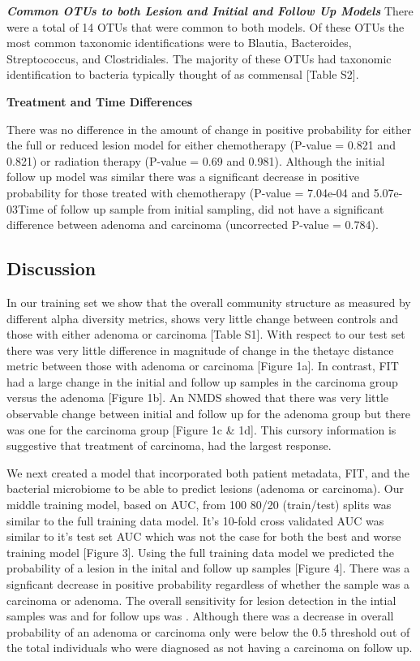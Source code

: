 \documentclass[12pt,]{article}
\begin{document}
\textbf{\emph{Common OTUs to both Lesion and Initial and Follow Up
Models}} There were a total of 14 OTUs that were common to both models.
Of these OTUs the most common taxonomic identifications were to Blautia,
Bacteroides, Streptococcus, and Clostridiales. The majority of these
OTUs had taxonomic identification to bacteria typically thought of as
commensal {[}Table S2{]}.

\textbf{Treatment and Time Differences}

There was no difference in the amount of change in positive probability
for either the full or reduced lesion model for either chemotherapy
(P-value = 0.821 and 0.821) or radiation therapy (P-value = 0.69 and
0.981). Although the initial follow up model was similar there was a
significant decrease in positive probability for those treated with
chemotherapy (P-value = 7.04e-04 and 5.07e-03Time of follow up sample
from initial sampling, did not have a significant difference between
adenoma and carcinoma (uncorrected P-value = 0.784).

\newpage

\subsection{Discussion}\label{discussion}

In our training set we show that the overall community structure as
measured by different alpha diversity metrics, shows very little change
between controls and those with either adenoma or carcinoma {[}Table
S1{]}. With respect to our test set there was very little difference in
magnitude of change in the thetayc distance metric between those with
adenoma or carcinoma {[}Figure 1a{]}. In contrast, FIT had a large
change in the initial and follow up samples in the carcinoma group
versus the adenoma {[}Figure 1b{]}. An NMDS showed that there was very
little observable change between initial and follow up for the adenoma
group but there was one for the carcinoma group {[}Figure 1c \& 1d{]}.
This cursory information is suggestive that treatment of carcinoma, had
the largest response.

We next created a model that incorporated both patient metadata, FIT,
and the bacterial microbiome to be able to predict lesions (adenoma or
carcinoma). Our middle training model, based on AUC, from 100 80/20
(train/test) splits was similar to the full training data model. It's
10-fold cross validated AUC was similar to it's test set AUC which was
not the case for both the best and worse training model {[}Figure 3{]}.
Using the full training data model we predicted the probability of a
lesion in the inital and follow up samples {[}Figure 4{]}. There was a
signficant decrease in positive probability regardless of whether the
sample was a carcinoma or adenoma. The overall sensitivity for lesion
detection in the intial samples was and for follow ups was . Although
there was a decrease in overall probability of an adenoma or carcinoma
only were below the 0.5 threshold out of the total individuals who were
diagnosed as not having a carcinoma on follow up.
\end{document}
